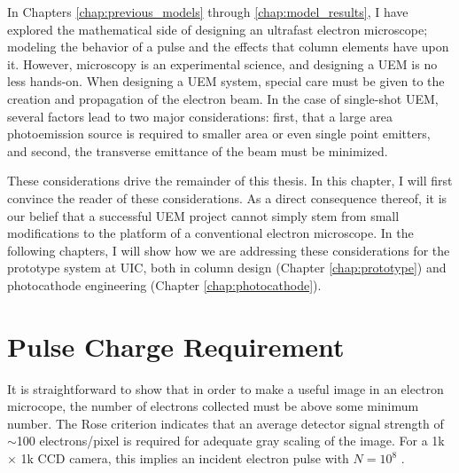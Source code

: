 
In Chapters \ref{chap:previous_models} through \ref{chap:model_results}, I have explored the mathematical side of designing an ultrafast electron microscope; modeling the behavior of a pulse and the effects that column elements have upon it.
However, microscopy is an experimental science, and designing a UEM is no less hands-on.
When designing a UEM system, special care must be given to the creation and propagation of the electron beam.
In the case of single-shot UEM, several factors lead to two major considerations: first, that a large area photoemission source is required to smaller area or even single point emitters, and second, the transverse emittance of the beam must be minimized.

These considerations drive the remainder of this thesis.
In this chapter, I will first convince the reader of these considerations.
As a direct consequence thereof, it is our belief that a successful UEM project cannot simply stem from small modifications to the platform of a conventional electron microscope.
In the following chapters, I will show how we are addressing these considerations for the prototype system at UIC, both in column design (Chapter \ref{chap:prototype}) and photocathode engineering (Chapter \ref{chap:photocathode}).

\section{Pulse Charge Requirement}

It is straightforward to show that in order to make a useful image in an electron microcope, the number of electrons collected must be above some minimum number.
The Rose criterion \cite{rose_television_1948} indicates that an average detector signal strength of $\sim$100 electrons/pixel is required for adequate gray scaling of the image.
For a 1k $\times$ 1k CCD camera, this implies an incident electron pulse with $N=10^8$ \cite{armstrong_prospects_2007}.

